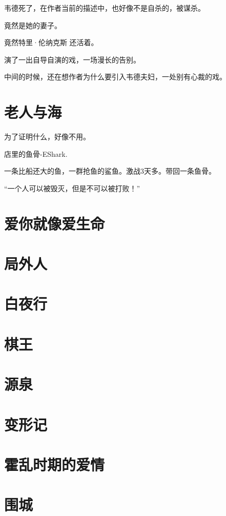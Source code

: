 \documentclass[UTF8,a4paper,12pt]{ctexbook}
\begin{document}
		韦德死了，在作者当前的描述中，也好像不是自杀的，被谋杀。
		
		竟然是她的妻子。
		
		竟然特里·伦纳克斯 还活着。
		
		演了一出自导自演的戏，一场漫长的告别。
		
		中间的时候，还在想作者为什么要引入韦德夫妇，一处别有心裁的戏。
	
	
	\section{老人与海}
		为了证明什么，好像不用。
		
		店里的鱼骨-EShark.
		
		一条比船还大的鱼，一群抢鱼的鲨鱼。激战3天多。带回一条鱼骨。
		
		“一个人可以被毁灭，但是不可以被打败！”
		
	\section{爱你就像爱生命}
		
	\section{局外人}
	
	\section{白夜行}
	
	\section{棋王}
	
	\section{源泉}
	
	\section{变形记}
	
	\section{霍乱时期的爱情}
	
	\section{围城}
	
\end{document}
